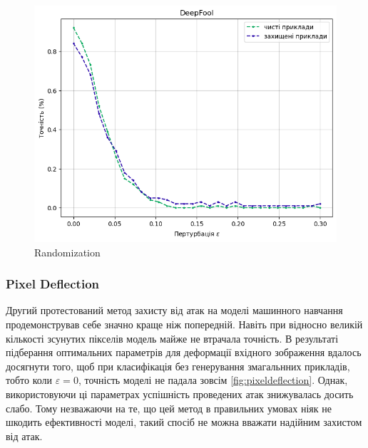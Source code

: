 \documentclass[a4paper,14pt]{extreport}
\begin{document}
\begin{figure}[!htb]
		\endminipage
		\includegraphics[width=1\textwidth]{resources/deepfool_rand_defence.png}
		\endminipage\hfill
		\caption{Randomization}
		\label{fig:randomization}
	\end{figure}

	\subsubsection{Pixel Deflection}
	\noindent
	Другий протестований метод захисту від атак на моделі машинного навчання продемонстрував себе значно краще ніж попередній. Навіть при відносно великій кількості зсунутих пікселів модель майже не втрачала точність. В результаті підберання оптимальних параметрів для деформації вхідного зображення вдалось досягнути того, щоб при класифікація без генерування змагальнних прикладів, тобто коли $\varepsilon=0$, точність моделі не падала зовсім \ref{fig:pixeldeflection}. Однак, використовуючи ці параметрах успішність проведених атак знижувалась досить слабо. Тому незважаючи на те, що цей метод в правильних умовах ніяк не шкодить ефективності моделі, такий спосіб не можна вважати надійним захистом від атак.
	
\end{document}
